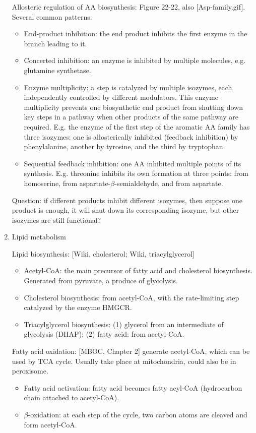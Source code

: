 \documentclass{report}
\begin{document}
\begin{enumerate}
Allosteric regulation of AA biosynthesis: Figure 22-22, also [Asp-family.gif]. Several common patterns: 
\begin{itemize}
	\item End-product inhibition: the end product inhibits the first enzyme in the branch leading to it. 
	\item Concerted inhibition: an enzyme is inhibited by multiple molecules, e.g. glutamine synthetase. 
	\item Enzyme multiplicity: a step is catalyzed by multiple isozymes, each independently controlled by different modulators. This enzyme multiplicity prevents one biosynthetic end product from shutting down key steps in a pathway when other products of the same pathway are required. E.g. the enzyme of the first step of the aromatic AA family has three isozymes: one is allosterically inhibited (feedback inhibition) by phenylalanine, another by tyrosine, and the third by tryptophan.
	\item Sequential feedback inhibition: one AA inhibited multiple points of its synthesis. E.g. threonine inhibits its own formation at three points: from homoserine, from aspartate-$\beta$-semialdehyde, and from aspartate. 
\end{itemize}

Question: if different products inhibit different isozymes, then suppose one product is enough, it will shut down its corresponding isozyme, but other isozymes are still functional? 

\item{Lipid metabolism}

Lipid biosynthesis: [Wiki, cholesterol; Wiki, triacylglycerol]
\begin{itemize}
\item Acetyl-CoA: the main precursor of fatty acid and cholesterol biosynthesis. Generated from pyruvate, a produce of glycolysis. 

\item Cholesterol biosynthesis: from acetyl-CoA, with the rate-limiting step catalyzed by the enzyme HMGCR. 

\item Triacylglycerol biosynthesis: (1) glycerol from an intermediate of glycolysis (DHAP); (2) fatty acid: from acetyl-CoA. 
\end{itemize}

Fatty acid oxidation: [MBOC, Chapter 2] generate acetyl-CoA, which can be used by TCA cycle. Usually take place at mitochondria, could also be in peroxisome. 
\begin{itemize}
	\item Fatty acid activation: fatty acid becomes fatty acyl-CoA (hydrocarbon chain attached to acetyl-CoA). 
	\item $\beta$-oxidation: at each step of the cycle, two carbon atoms are cleaved and form acetyl-CoA. 
\end{itemize}


\end{enumerate}
\end{document}
